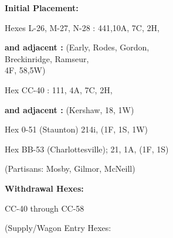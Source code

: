 \begin{scenariodata}
\textbf{Initial Placement:}\\
\end{scenariodata}

\begin{scenariodata}
Hexes L-26, M-27, N-28 : 441,10A, 7C, 2H,\\
\end{scenariodata}

\begin{scenariodata}
\textbf{and adjacent :} (Early, Rodes, Gordon,\\
Breckinridge, Ramseur,\\
4F, 58,5W)\\
\end{scenariodata}

\begin{scenariodata}
Hex CC-40 : 111, 4A, 7C, 2H,\\
\end{scenariodata}

\begin{scenariodata}
\textbf{and adjacent :} (Kershaw, 18, 1W)\\
\end{scenariodata}

\begin{scenariodata}
Hex 0-51 (Staunton) 214i, (1F, 1S, 1W)\\
\end{scenariodata}

\begin{scenariodata}
Hex BB-53 (Charlottesville); 21, 1A, (1F, 1S)\\
\end{scenariodata}

\begin{scenariodata}
(Partisans: Mosby, Gilmor, McNeill)\\
\end{scenariodata}

\begin{scenariodata}
\textbf{Withdrawal Hexes:}\\
\end{scenariodata}

\begin{scenariodata}
CC-40 through CC-58\\
\end{scenariodata}

\begin{scenariodata}
(Supply/Wagon Entry Hexes:\\
\end{scenariodata}

